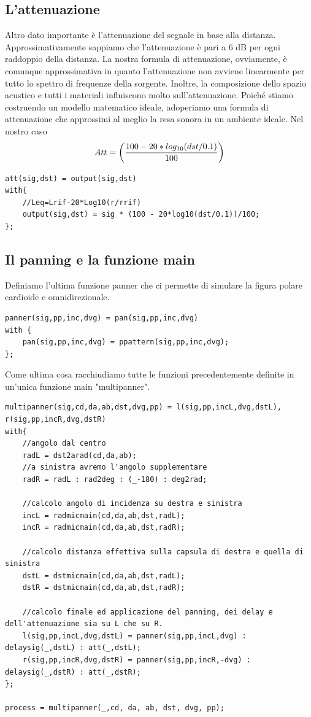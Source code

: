 \documentclass{article}
\begin{document}
\subsection{L'attenuazione}
    Altro dato importante è l'attenuazione del segnale in base alla distanza. Approssimativamente sappiamo che l'attenuazione è pari a 6 dB per ogni raddoppio della distanza. La nostra formula di attenuazione, ovviamente, è comunque approssimativa in quanto l'attenuazione non avviene linearmente per tutto lo spettro di frequenze della sorgente. Inoltre, la composizione dello spazio acustico e tutti i materiali influiscono molto sull'attenuazione. Poiché stiamo costruendo un modello matematico ideale, adoperiamo una formula di attenuazione che approssimi al meglio la resa sonora in un ambiente ideale. Nel nostro caso\\
    $$Att = \biggl({100 - 20*log_{10}(dst/0.1)\over100} \biggr)$$
\begin{lstlisting}
att(sig,dst) = output(sig,dst)
with{
    //Leq=Lrif-20*Log10(r/rrif)
    output(sig,dst) = sig * (100 - 20*log10(dst/0.1))/100;
};
\end{lstlisting}

\subsection{Il panning e la funzione main}
Definiamo l'ultima funzione panner che ci permette di simulare la figura polare cardioide e omnidirezionale. 
\begin{lstlisting}
panner(sig,pp,inc,dvg) = pan(sig,pp,inc,dvg)
with {
    pan(sig,pp,inc,dvg) = ppattern(sig,pp,inc,dvg); 
};
\end{lstlisting}

Come ultima cosa racchiudiamo tutte le funzioni precedentemente definite in un'unica funzione main "multipanner".

\begin{lstlisting}
multipanner(sig,cd,da,ab,dst,dvg,pp) = l(sig,pp,incL,dvg,dstL), r(sig,pp,incR,dvg,dstR)
with{
    //angolo dal centro
    radL = dst2arad(cd,da,ab);
    //a sinistra avremo l'angolo supplementare
    radR = radL : rad2deg : (_-180) : deg2rad;

    //calcolo angolo di incidenza su destra e sinistra
    incL = radmicmain(cd,da,ab,dst,radL);
    incR = radmicmain(cd,da,ab,dst,radR);

    //calcolo distanza effettiva sulla capsula di destra e quella di sinistra
    dstL = dstmicmain(cd,da,ab,dst,radL);
    dstR = dstmicmain(cd,da,ab,dst,radR);

    //calcolo finale ed applicazione del panning, dei delay e dell'attenuazione sia su L che su R.
    l(sig,pp,incL,dvg,dstL) = panner(sig,pp,incL,dvg) : delaysig(_,dstL) : att(_,dstL);
    r(sig,pp,incR,dvg,dstR) = panner(sig,pp,incR,-dvg) : delaysig(_,dstR) : att(_,dstR);
};

process = multipanner(_,cd, da, ab, dst, dvg, pp);
\end{lstlisting}
\end{document}
